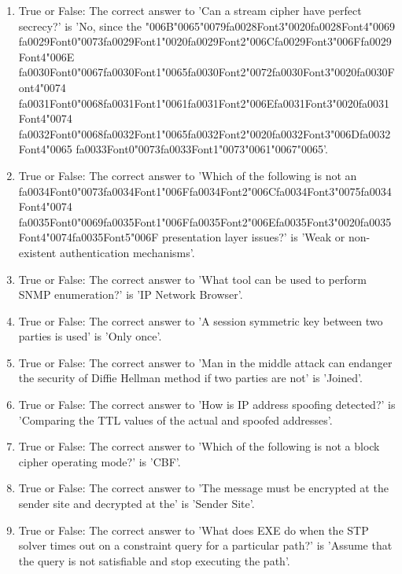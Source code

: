\documentclass[12pt]{article}
\begin{document}
\begin{enumerate}[label=\arabic*.]
\item True or False: The correct answer to 'Can a stream cipher have perfect secrecy?' is 'No, since the {\char"006B}{\char"0065}{\char"0079}{\csname fa0028Font3\endcsname\char"0020}{\csname fa0028Font4\endcsname\char"0069} {\csname fa0029Font0\endcsname\char"0073}{\csname fa0029Font1\endcsname\char"0020}{\csname fa0029Font2\endcsname\char"006C}{\csname fa0029Font3\endcsname\char"006F}{\csname fa0029Font4\endcsname\char"006E} {\csname fa0030Font0\endcsname\char"0067}{\csname fa0030Font1\endcsname\char"0065}{\csname fa0030Font2\endcsname\char"0072}{\csname fa0030Font3\endcsname\char"0020}{\csname fa0030Font4\endcsname\char"0074} {\csname fa0031Font0\endcsname\char"0068}{\csname fa0031Font1\endcsname\char"0061}{\csname fa0031Font2\endcsname\char"006E}{\csname fa0031Font3\endcsname\char"0020}{\csname fa0031Font4\endcsname\char"0074} {\csname fa0032Font0\endcsname\char"0068}{\csname fa0032Font1\endcsname\char"0065}{\csname fa0032Font2\endcsname\char"0020}{\csname fa0032Font3\endcsname\char"006D}{\csname fa0032Font4\endcsname\char"0065} {\csname fa0033Font0\endcsname\char"0073}{\csname fa0033Font1\endcsname\char"0073}{\char"0061}{\char"0067}{\char"0065}'.
\item True or False: The correct answer to 'Which of the following is not an {\csname fa0034Font0\endcsname\char"0073}{\csname fa0034Font1\endcsname\char"006F}{\csname fa0034Font2\endcsname\char"006C}{\csname fa0034Font3\endcsname\char"0075}{\csname fa0034Font4\endcsname\char"0074} {\csname fa0035Font0\endcsname\char"0069}{\csname fa0035Font1\endcsname\char"006F}{\csname fa0035Font2\endcsname\char"006E}{\csname fa0035Font3\endcsname\char"0020}{\csname fa0035Font4\endcsname\char"0074}{\csname fa0035Font5\endcsname\char"006F} presentation layer issues?' is 'Weak or non-existent authentication mechanisms'.
\item True or False: The correct answer to 'What tool can be used to perform SNMP enumeration?' is 'IP Network Browser'.
\item True or False: The correct answer to 'A session symmetric key between two parties is used' is 'Only once'.
\item True or False: The correct answer to 'Man in the middle attack can endanger the security of Diffie Hellman method if two parties are not' is 'Joined'.
\item True or False: The correct answer to 'How is IP address spoofing detected?' is 'Comparing the TTL values of the actual and spoofed addresses'.
\item True or False: The correct answer to 'Which of the following is not a block cipher operating mode?' is 'CBF'.
\item True or False: The correct answer to 'The message must be encrypted at the sender site and decrypted at the' is 'Sender Site'.
\item True or False: The correct answer to 'What does EXE do when the STP solver times out on a constraint query for a particular path?' is 'Assume that the query is not satisfiable and stop executing the path'.
\end{enumerate}
\end{document}
